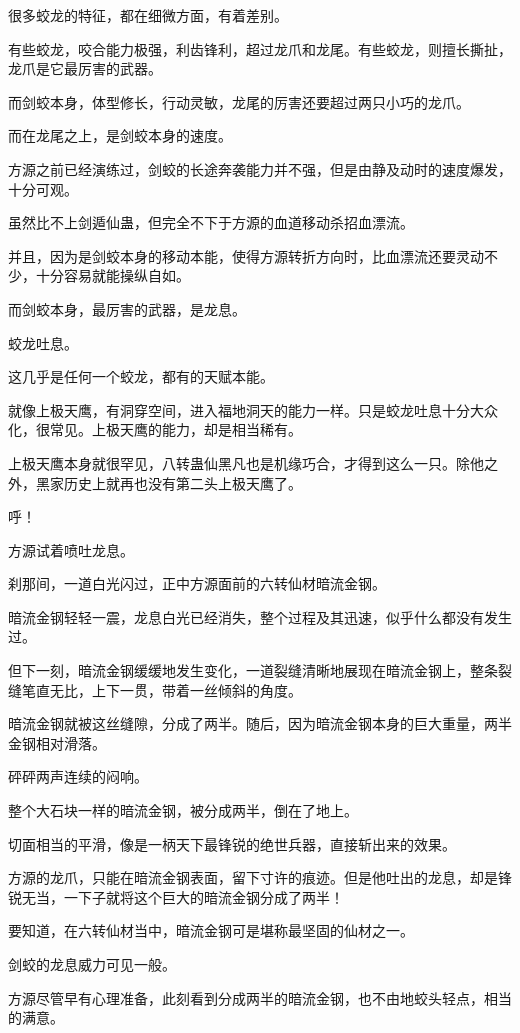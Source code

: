 \begin{this_body}
很多蛟龙的特征，都在细微方面，有着差别。

有些蛟龙，咬合能力极强，利齿锋利，超过龙爪和龙尾。有些蛟龙，则擅长撕扯，龙爪是它最厉害的武器。

而剑蛟本身，体型修长，行动灵敏，龙尾的厉害还要超过两只小巧的龙爪。

而在龙尾之上，是剑蛟本身的速度。

方源之前已经演练过，剑蛟的长途奔袭能力并不强，但是由静及动时的速度爆发，十分可观。

虽然比不上剑遁仙蛊，但完全不下于方源的血道移动杀招血漂流。

并且，因为是剑蛟本身的移动本能，使得方源转折方向时，比血漂流还要灵动不少，十分容易就能操纵自如。

而剑蛟本身，最厉害的武器，是龙息。

蛟龙吐息。

这几乎是任何一个蛟龙，都有的天赋本能。

就像上极天鹰，有洞穿空间，进入福地洞天的能力一样。只是蛟龙吐息十分大众化，很常见。上极天鹰的能力，却是相当稀有。

上极天鹰本身就很罕见，八转蛊仙黑凡也是机缘巧合，才得到这么一只。除他之外，黑家历史上就再也没有第二头上极天鹰了。

呼！

方源试着喷吐龙息。

刹那间，一道白光闪过，正中方源面前的六转仙材暗流金钢。

暗流金钢轻轻一震，龙息白光已经消失，整个过程及其迅速，似乎什么都没有发生过。

但下一刻，暗流金钢缓缓地发生变化，一道裂缝清晰地展现在暗流金钢上，整条裂缝笔直无比，上下一贯，带着一丝倾斜的角度。

暗流金钢就被这丝缝隙，分成了两半。随后，因为暗流金钢本身的巨大重量，两半金钢相对滑落。

砰砰两声连续的闷响。

整个大石块一样的暗流金钢，被分成两半，倒在了地上。

切面相当的平滑，像是一柄天下最锋锐的绝世兵器，直接斩出来的效果。

方源的龙爪，只能在暗流金钢表面，留下寸许的痕迹。但是他吐出的龙息，却是锋锐无当，一下子就将这个巨大的暗流金钢分成了两半！

要知道，在六转仙材当中，暗流金钢可是堪称最坚固的仙材之一。

剑蛟的龙息威力可见一般。

方源尽管早有心理准备，此刻看到分成两半的暗流金钢，也不由地蛟头轻点，相当的满意。


\end{this_body}
